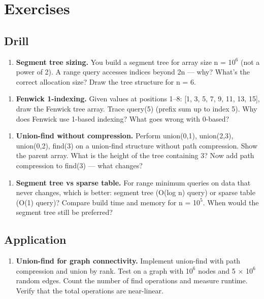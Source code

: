 \section{Exercises}

\subsection{Drill}

\begin{enumerate}
\item \textbf{Segment tree sizing.} You build a segment tree for array size n = 1$0^{6}$ (not a power of 2). A range query accesses indices beyond 2n — why? What's the correct allocation size? Draw the tree structure for n = 6.
\end{enumerate}

\begin{enumerate}
\item \textbf{Fenwick 1-indexing.} Given values at positions 1–8: [1, 3, 5, 7, 9, 11, 13, 15], draw the Fenwick tree array. Trace query(5) (prefix sum up to index 5). Why does Fenwick use 1-based indexing? What goes wrong with 0-based?
\end{enumerate}

\begin{enumerate}
\item \textbf{Union-find without compression.} Perform union(0,1), union(2,3), union(0,2), find(3) on a union-find structure without path compression. Show the parent array. What is the height of the tree containing 3? Now add path compression to find(3) — what changes?
\end{enumerate}

\begin{enumerate}
\item \textbf{Segment tree vs sparse table.} For range minimum queries on data that never changes, which is better: segment tree (O(log n) query) or sparse table (O(1) query)? Compare build time and memory for n = 1$0^{5}$. When would the segment tree still be preferred?
\end{enumerate}

\subsection{Application}

\begin{enumerate}
\item \textbf{Union-find for graph connectivity.} Implement union-find with path compression and union by rank. Test on a graph with 1$0^{6}$ nodes and 5 $\times $ 1$0^{6}$ random edges. Count the number of find operations and measure runtime. Verify that the total operations are near-linear.
\end{enumerate}

